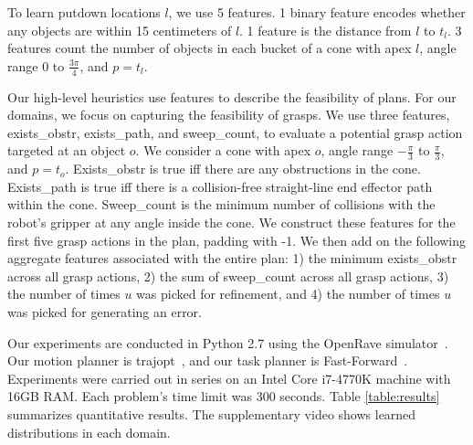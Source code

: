 To learn putdown locations $l$, we use 5 features. 1 binary feature encodes whether
any objects are within 15 centimeters of $l$. 1 feature is the
distance from $l$ to $t_{l}$. 3 features count the number of objects
in each bucket of a cone with apex $l$, angle range 0 to $\frac{3\pi}{4}$, and $p = t_{l}$.

Our high-level heuristics use features to describe the feasibility of
plans. For our domains, we focus on capturing the feasibility of
grasps. We use three features, exists\_obstr, exists\_path, and sweep\_count, to evaluate a potential grasp action
targeted at an object $o$. We consider a cone with apex $o$, angle
range $-\frac{\pi}{3}$ to $\frac{\pi}{3}$, and $p = t_{o}$.
Exists\_obstr is true iff there are any obstructions in the
cone. Exists\_path is true iff there is a collision-free straight-line end effector path
within the cone. Sweep\_count is the minimum number of collisions with
the robot's gripper at any angle inside the cone. We construct
these features for the first five grasp actions in the plan, padding
with -1. We then add on the following aggregate features associated
with the entire plan: 1) the minimum exists\_obstr across all grasp
actions, 2) the sum of sweep\_count across all grasp actions, 3) the
number of times $u$ was picked for refinement, and 4) the number of
times $u$ was picked for generating an error.

Our experiments are conducted in Python 2.7 using the OpenRave
simulator~\cite{Diankov_2008_6117}.  Our motion planner is
trajopt~\cite{schulman2013finding}, and our task planner is
Fast-Forward~\cite{FF}. Experiments were carried out in series on an
Intel Core i7-4770K machine with 16GB RAM. Each problem's time limit
was 300 seconds. Table \ref{table:results} summarizes quantitative
results. The supplementary video shows learned distributions in each domain.

